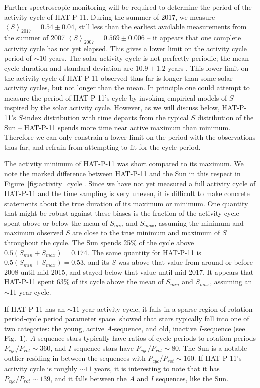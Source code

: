 Further spectroscopic monitoring will be required to determine the period of the activity cycle of HAT-P-11. During the summer of 2017, we measure $\left< S\right>_{2017} = 0.54 \pm 0.04$, still less than the earliest available measurements from the summer of 2007 $\left< S\right>_{2007} = 0.569 \pm 0.006$ -- it appears that one complete activity cycle has not yet elapsed. This gives a lower limit on the activity cycle period of $\sim 10$ years. The solar activity cycle is not perfectly periodic; the mean cycle duration and standard deviation are $10.9 \pm 1.2$ years \citep{Hathaway2002}. This lower limit on the activity cycle of HAT-P-11 observed thus far is longer than some solar activity cycles, but not longer than the mean. In principle one could attempt to measure the period of HAT-P-11's cycle by invoking empirical models of $S$ inspired by the solar activity cycle. However, as we will discuss below, HAT-P-11's $S$-index distribution with time departs from the typical $S$ distribution of the Sun -- HAT-P-11 spends more time near active maximum than minimum. Therefore we can only constrain a lower limit on the period with the observations thus far, and refrain from attempting to fit for the cycle period. 

The activity minimum of HAT-P-11 was short compared to its maximum. We note the marked difference between HAT-P-11 and the Sun in this respect in Figure~\ref{fig:activity_cycle}. Since we have not yet measured a full activity cycle of HAT-P-11 and the time sampling is very uneven, it is difficult to make concrete statements about the true duration of its maximum or minimum. One quantity that might be robust against these biases is the fraction of the activity cycle spent above or below the mean of $S_{min}$ and $S_{max}$, assuming the minimum and maximum observed $S$ are close to the true minimum and maximum of $S$ throughout the cycle. The Sun spends 25\% of the cycle above $0.5 (S_{min} + S_{max}) = 0.174$. The same quantity for HAT-P-11 is $0.5 (S_{min} + S_{max}) = 0.53$, and its $S$ was above that value from around or before 2008 until mid-2015, and stayed below that value until mid-2017. It appears that HAT-P-11 spent 63\% of its cycle above the mean of $S_{min}$ and $S_{max}$, assuming an $\sim 11$ year cycle. 

If HAT-P-11 has an $\sim 11$ year activity cycle, it falls in a sparse region of rotation period-cycle period parameter space. \citet{Bohm-Vitense2007} showed that stars typically fall into one of two categories: the young, active $A$-sequence, and old, inactive $I$-sequence (see \citealt{Bohm-Vitense2007} Fig.~1). $A$-sequence stars typically have ratios of cycle periods to rotation periods $P_{cyc}/P_{rot} \sim 360$, and $I$-sequence stars have $P_{cyc}/P_{rot} \sim 80$.  The Sun is a notable outlier residing in between the sequences with $P_{cyc}/P_{rot} \sim 160$. If HAT-P-11's activity cycle is roughly $\sim 11$ years, it is interesting to note that it has $P_{cyc}/P_{rot} \sim 139$, and it falls between the $A$ and $I$ sequences, like the Sun.

